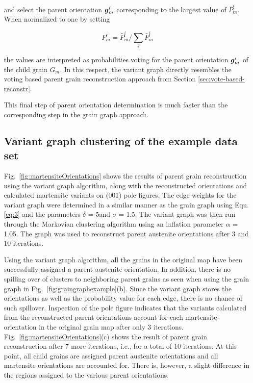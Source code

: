 \documentclass{elsarticle}
\renewcommand{\vec}[1]{\ensuremath \mathbf{\boldsymbol{#1}}}
\numberwithin{equation}{section}
\begin{document}
and select the parent orientation $\vec g_m^i$ corresponding to the largest value of $\bar P_{m}^{i}$. When normalized to one by setting

\begin{equation}
  \label{eq:Pmi}
  P_{m}^{i}
  = \bar P_{m}^i / \sum_{i} \bar P_m^i
\end{equation}

the values are interpreted as probabilities voting for the parent orientation $\vec g_m^i$ of the child grain $G_m$. In this respect, the variant graph directly resembles the voting based parent grain reconstruction approach from Section \ref{sec:vote-based-reconstr}.

This final step of parent orientation determination is much faster than the corresponding step in the grain graph approach.



\subsection{Variant graph clustering of the example data set}
\label{sec:example-applications}
 Fig.~\ref{fig:martensiteOrientations} shows the results of parent grain reconstruction using the variant graph algorithm, along with the reconstructed orientations and calculated martensite variants on (001) pole figures. The edge weights for the variant graph were determined in a similar manner as the grain graph using Equ. \eqref{eq:3} and the parameters $\delta$ = 5\textdegree and  $\sigma$ = 1.5\textdegree. The variant graph was then run through the Markovian clustering algorithm using an inflation parameter $\alpha$ = 1.05. The graph was used to reconstruct parent austenite orientations after 3 and 10 iterations.
 
 Using the variant graph algorithm, all the grains in the original map have been successfully assigned a parent austenite orientation. In addition, there is no spilling over of clusters to neighboring parent grains as seen when using the grain graph in Fig.~\ref{fig:graingraphexample}(b). Since the variant graph stores the orientations as well as the probability value for each edge, there is no chance of such spillover. Inspection of the pole figure indicates that the variants calculated from the reconstructed parent orientations account for each martensite orientation in the original grain map after only 3 iterations. Fig.~\ref{fig:martensiteOrientations}(c) shows the result of parent grain reconstruction after 7 more iterations, i.e., for a total of 10 iterations. At this point, all child grains are assigned parent austenite orientations and all martensite orientations are accounted for. There is, however, a slight difference in the regions assigned to the various parent orientations.
\end{document}
